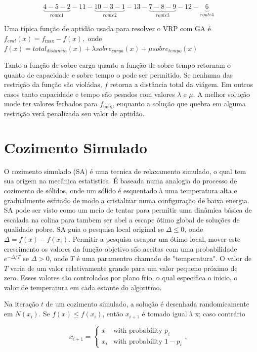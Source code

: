 \[\underbrace{4-5-2}_{route1}-11-\underbrace{10-3-1}_{route2}-13-\underbrace{7-8-9}_{route3}-12-\underbrace{6}_{route4}\]



 Uma típica função de aptidão  usada para resolver o VRP com GA é $f_{eval}(x) = f_{\max}-f(x),$
onde $f(x)={total}_{distancia}(x)+\lambda sobre_{carga}(x)+ \mu sobre_{tempo}(x)$

 Tanto a função de sobre carga quanto a função de sobre tempo  retornam o quanto de capacidade e
sobre tempo o pode ser permitido. Se nenhuma das restrição da função são violádas, $f$ retorna a
distância total da viágem. Em outros casos tanto capacidade e tempo são pesados com valores
$\lambda$ e $\mu$. A melhor solução mode ter valores fechados para $f_{\max}$, enquanto a solução
que quebra em alguma restrição verá penalizada seu valor de aptidão.

\section{Cozimento Simulado}

 O cozimento simulado (SA) é uma tecnica de relaxamento simulado, o qual tem sua origem na mecânica
estatistica. É baseada numa analogia do processo de cozimento de sólidos, onde um sólido é
esquentado à uma temperatura alta e gradualmente esfriado de modo a cristalizar numa configuração de
baixa energia. SA pode ser visto como um meio de tentar para permitir uma dinâmica básica de
escalada na colina para tambem ser abel a escape ótimo global de soluções de qualidade pobre. SA
guia o pesquisa local original se $\Delta \leq 0$, onde $\Delta = f(x)-f(x_i)$. Permitir a pesquisa
escapar um ótimo local, mover este crescimento os valores da função objetivo são aceitas com uma
probabilidade $e^{-\Delta/T}$ se $\Delta > 0$, onde $T$ é uma paramentro chamado de "temperatura". O
valor de $T$ varia de um valor relativamente grande para um valor pequeno próximo de zero. Esses
valores são controlados por plano frio, o qual especifica o inicio, o valor de temperatura em cada
estante do algoritmo.

 Na iteração $t$ de um cozimento simulado, a solução é desenhada randomicamente em $N(x_i)$. Se
$f(x) \leq f(x_i)$, então $x_{i+1}$ é tomado igual à x; caso contrário

\[x_{i+1}=\begin{cases} 
x & \text{with probability } p_{i}\\ 
x_{i} & \text{with probability }1-p_{i} 
\end{cases},\]


